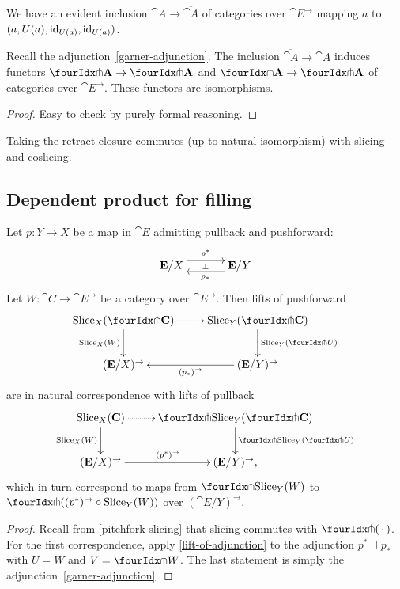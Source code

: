 \documentclass[reqno,10pt,a4paper,oneside]{amsart}
\begin{document}
We have an evident inclusion $\cat{A} \to \overline{\cat{A}}$ of categories over $\cat{E}^{\to}$ mapping $a$ to $(a, U(a), \operatorname{id}_{U(a)}, \operatorname{id}_{U(a)})$.

\begin{lemma}
\label{retract-closure}
Recall the adjunction~\eqref{garner-adjunction}.
The inclusion $\overline{\cat{A}} \to \cat{A}$ induces functors $\liftl{\overline{\cat{A}}} \to \liftl{\cat{A}}$ and $\liftr{\overline{\cat{A}}} \to \liftr{\cat{A}}$ of categories over $\cat{E}^{\to}$.
These functors are isomorphisms.
\end{lemma}

\begin{proof}
Easy to check by purely formal reasoning.
\end{proof}

\begin{remark}
\label{retract-closure-slicing}
Taking the retract closure commutes (up to natural isomorphism) with slicing and coslicing.
\end{remark}

\subsection{Dependent product for filling}

\begin{corollary}
\label{lift-dependent-product}
Let $p : Y \to X$ be a map in $\cat{E}$ admitting pullback and pushforward:
\[
\xymatrix@C+1em{
  \cat{E}/X
  \ar@<5pt>[r]^{p^*}
  \ar@{}[r]|{\bot}
&
  \cat{E}/Y
  \ar@<5pt>[l]^{p_*}
}
\]
Let $W : \cat{C} \to \cat{E}^{\to}$ be a category over $\cat{E}^{\to}$.
Then lifts of pushforward
\[
\xymatrix{
  \Slice_X(\liftr{\cat{C}})
  \ar@{.>}[r]
  \ar[d]_{\Slice_X(W)}
&
  \Slice_Y(\liftr{\cat{C}})
  \ar[d]^{\Slice_Y(\liftr{U})}
\\
  (\cat{E}/X)^{\to}
&
  (\cat{E}/Y)^{\to}
  \ar[l]^{(p_*)^{\to}}
}
\]
are in natural correspondence with lifts of pullback
\[
\xymatrix{
  \Slice_X(\cat{C})
  \ar@{.>}[r]
  \ar[d]_{\Slice_X(W)}
&
  \liftl{\Slice_Y(\liftr{\cat{C}})}
  \ar[d]^{\liftl{\Slice_Y(\liftr{U})}}
\\
  (\cat{E}/X)^{\to}
  \ar[r]^{(p^*)^{\to}}
&
  (\cat{E}/Y)^{\to},
}
\]
which in turn correspond to maps from $\liftr{\Slice_Y(W)}$ to $\liftr{((p^*)^{\to} \cc \Slice_Y(W))}$ over $(\cat{E}/Y)^{\to}$.
\end{corollary}

\begin{proof}
Recall from \cref{pitchfork-slicing} that slicing commutes with $\liftr{\brarghole}$.
For the first correspondence, apply \cref{lift-of-adjunction} to the adjunction $p^* \dashv p_*$ with $U = W$ and $V = \liftr{W}$.
The last statement is simply the adjunction~\eqref{garner-adjunction}.
\end{proof}
\end{document}
